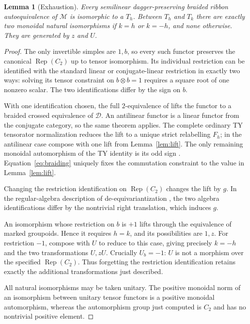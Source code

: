 \documentclass{amsart}
\newtheorem{lemma}[theorem]{Lemma}
\theoremstyle{definition}\newtheorem{definition}[theorem]{Definition}
\theoremstyle{remark}\newtheorem{remark}[theorem]{Remark}
\newcommand{\M}{\mathcal M}\newcommand{\D}{\mathcal D}
\newcommand{\Rep}{\operatorname{Rep}}\newcommand{\TY}{\operatorname{TY}}
\begin{document}
\begin{lemma}[Exhaustion]\label{lem:exhaust}
Every semilinear dagger-preserving braided ribbon autoequivalence of
$\M$ is isomorphic to a $T_h$. Between $T_h$ and $T_k$ there are exactly
two monoidal natural isomorphisms if $k=h$ or $k=-h$, and none otherwise.
They are generated by $z$ and $U$.
\end{lemma}
\begin{proof}
The only invertible simples are $1,b$, so every such functor preserves
the canonical $\Rep(C_2)$ up to tensor isomorphism. Its individual
restriction can be identified with the standard linear or conjugate-linear
restriction in exactly two ways: solving its tensor constraint on
$b\otimes b=1$ requires a square root of one nonzero scalar. The two
identifications differ by the sign on $b$.

With one identification chosen, the full $2$-equivalence of
\cite[Theorem 4.44]{DGNO} lifts the functor to a braided crossed
equivalence of $\D$. An antilinear functor is a linear functor from
the conjugate category, so the same theorem applies. The complete
ordinary TY tensorator normalization
\cite[Lemma 2.16 and Remark 2.17]{EM} reduces the lift to a unique
strict relabelling $F_h$; in the antilinear case compose with one
lift from Lemma~\ref{lem:lift}. The only remaining monoidal
automorphism of the TY identity is its odd sign
\cite[Lemma 4.8]{Gal}. Equation~\eqref{eq:braiding} uniquely fixes the
commutation constraint to the value in Lemma~\ref{lem:lift}.

Changing the restriction identification on $\Rep(C_2)$ changes the lift
by $g$. In the regular-algebra description of de-equivariantization
\cite[Section 4.4.7]{DGNO}, the two algebra identifications differ by
the nontrivial right translation, which induces $g$.

An isomorphism whose restriction on $b$ is $+1$ lifts through the
equivalence of marked groupoids. Hence it requires $h=k$, and its possibilities
are $1,z$. For restriction $-1$, compose with $U$ to reduce to this
case, giving precisely $k=-h$ and the two transformations $U,zU$.
Crucially $U_b=-1$: $U$ is not a morphism over the specified
$\Rep(C_2)$. Thus forgetting the restriction identification retains
exactly the additional transformations just described.

All natural isomorphisms may be taken unitary. The positive monoidal
norm of an isomorphism between unitary tensor functors is a positive
monoidal automorphism, whereas the automorphism group just computed
is $C_2$ and has no nontrivial positive element.
\end{proof}
\end{document}
